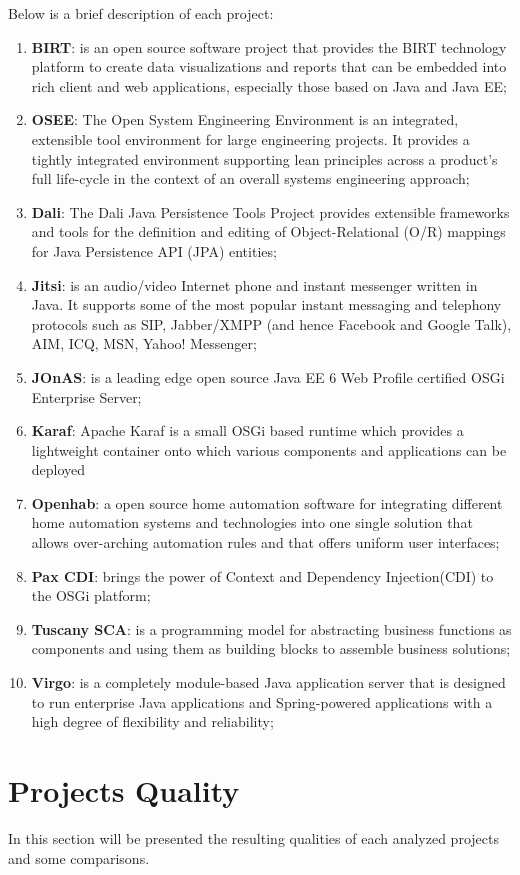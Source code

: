 Below is a brief description of each project:

\begin{enumerate}
\item \textbf{BIRT}: is an open source software project that provides the BIRT technology platform to create data visualizations and reports that can be embedded into rich client and web applications, especially those based on Java and Java EE;
\item \textbf{OSEE}: The Open System Engineering Environment is an integrated, extensible tool environment for large engineering projects. It provides a tightly integrated environment supporting lean principles across a product's full life-cycle in the context of an overall systems engineering approach;
\item \textbf{Dali}: The Dali Java Persistence Tools Project provides extensible frameworks and tools for the definition and editing of Object-Relational (O/R) mappings for Java Persistence API (JPA) entities;
\item \textbf{Jitsi}: is an audio/video Internet phone and instant messenger written in Java. It supports some of the most popular instant messaging and telephony protocols such as SIP, Jabber/XMPP (and hence Facebook and Google Talk), AIM, ICQ, MSN, Yahoo! Messenger;
\item \textbf{JOnAS}: is a leading edge open source Java EE 6 Web Profile certified OSGi Enterprise Server;
\item \textbf{Karaf}: Apache Karaf is a small OSGi based runtime which provides a lightweight container onto which various components and applications can be deployed
\item \textbf{Openhab}: a open source home automation software for integrating different home automation systems and technologies into one single solution that allows over-arching automation rules and that offers uniform user interfaces;
\item \textbf{Pax CDI}: brings the power of Context and Dependency Injection(CDI) to the OSGi platform; 
\item \textbf{Tuscany SCA}: is a programming model for abstracting business functions as components and using them as building blocks to assemble business solutions; 
\item \textbf{Virgo}: is a completely module-based Java application server that is designed to run enterprise Java applications and Spring-powered applications with a high degree of flexibility and reliability; 
\end{enumerate}


\section{Projects Quality}
In this section will be presented the resulting qualities of each analyzed projects and some comparisons.

